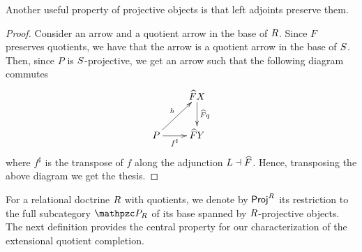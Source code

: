 Another useful property of projective objects is that left adjoints preserve them.  

\begin{proof}
Consider an arrow  and a quotient arrow  in the base of $R$. 
Since $F$ preserves quotients, we have that the arrow  is a quotient arrow in the base of $S$. 
Then, since $P$ is $S$-projective, we get an arrow  such that the following diagram commutes
\[\xymatrix{
& \fn{F}X \ar[d]^-{\fn{F}q} 
\\
  P \ar[ru]^-{h} \ar[r]_-{f^\sharp} 
& \fn{F}Y 
}\]
where $f^\sharp$ is the transpose of $f$ along the adjunction $L \dashv\widehat{F}$. 
Hence, transposing the above diagram we get the thesis. 
\end{proof}

For a relational doctrine $R$ with quotients, 
we denote by $\mathsf{Proj}^{R}$ its restriction to the full subcategory $\Proj\RDoc$ of its base spanned by $R$-projective objects.  
% 
The next definition  provides the central property for our characterization of the extensional quotient completion. 


